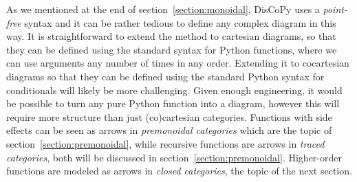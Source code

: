 As we mentioned at the end of section~\ref{section:monoidal}, DisCoPy uses a \emph{point-free} syntax and it can be rather tedious to define any complex diagram in this way.
It is straightforward to extend the  method to cartesian diagrams, so that they can be defined using the standard syntax for Python functions, where we can use arguments any number of times in any order.
Extending it to cocartesian diagrams so that they can be defined using the standard Python syntax for conditionals will likely be more challenging.
Given enough engineering, it would be possible to turn any pure Python function into a diagram, however this will require more structure than just (co)cartesian categories.
Functions with side effects can be seen as arrows in \emph{premonoidal categories} which are the topic of section~\ref{section:premonoidal}, while recursive functions are arrows in \emph{traced categories}, both will be discussed in section~\ref{section:premonoidal}.
Higher-order functions are modeled as arrows in \emph{closed categories}, the topic of the next section.
